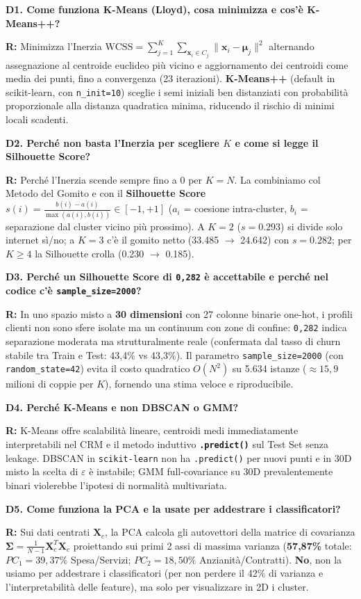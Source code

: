 \documentclass[10pt, a4paper]{article}
\newcommand{\qa}[2]{%
  \par\vspace{4pt}\noindent\textbf{\color{PrimaryNavy}#1}\par\vspace{1pt}%
  \noindent\textbf{\color{SecondaryBlue}R:} #2\par\vspace{2pt}%
}
\begin{document}
\qa{D1. Come funziona K-Means (Lloyd), cosa minimizza e cos'è K-Means++?}{
Minimizza l'Inerzia $\text{WCSS} = \sum_{j=1}^K \sum_{\mathbf{x}_i \in C_j} \|\mathbf{x}_i - \boldsymbol{\mu}_j\|^2$ alternando assegnazione al centroide euclideo più vicino e aggiornamento dei centroidi come media dei punti, fino a convergenza (23 iterazioni). \textbf{K-Means++} (default in scikit-learn, con \texttt{n\_init=10}) sceglie i semi iniziali ben distanziati con probabilità proporzionale alla distanza quadratica minima, riducendo il rischio di minimi locali scadenti.}

\qa{D2. Perché non basta l'Inerzia per scegliere $K$ e come si legge il Silhouette Score?}{
Perché l'Inerzia scende sempre fino a 0 per $K=N$. La combiniamo col Metodo del Gomito e con il \textbf{Silhouette Score} $s(i) = \frac{b(i)-a(i)}{\max(a(i), b(i))} \in [-1, +1]$ ($a_i$ = coesione intra-cluster, $b_i$ = separazione dal cluster vicino più prossimo). A $K=2$ ($s=0.293$) si divide solo internet sì/no; a $K=3$ c'è il gomito netto (33.485 $\rightarrow$ 24.642) con $s=0.282$; per $K \ge 4$ la Silhouette crolla (0.230 $\rightarrow$ 0.185).}

\qa{D3. Perché un Silhouette Score di \texttt{0,282} è accettabile e perché nel codice c'è \texttt{sample\_size=2000}?}{
In uno spazio misto a \textbf{30 dimensioni} con 27 colonne binarie one-hot, i profili clienti non sono sfere isolate ma un continuum con zone di confine: \texttt{0,282} indica separazione moderata ma strutturalmente reale (confermata dal tasso di churn stabile tra Train e Test: 43,4\% vs 43,3\%). Il parametro \texttt{sample\_size=2000} (con \texttt{random\_state=42}) evita il costo quadratico $O(N^2)$ su 5.634 istanze ($\approx 15{,}9$ milioni di coppie per $K$), fornendo una stima veloce e riproducibile.}

\qa{D4. Perché K-Means e non DBSCAN o GMM?}{
K-Means offre scalabilità lineare, centroidi medi immediatamente interpretabili nel CRM e il metodo induttivo \textbf{\texttt{.predict()}} sul Test Set senza leakage. DBSCAN in \texttt{scikit-learn} non ha \texttt{.predict()} per nuovi punti e in 30D misto la scelta di $\varepsilon$ è instabile; GMM full-covariance su 30D prevalentemente binari violerebbe l'ipotesi di normalità multivariata.}

\qa{D5. Come funziona la PCA e la usate per addestrare i classificatori?}{
Sui dati centrati $\mathbf{X}_c$, la PCA calcola gli autovettori della matrice di covarianza $\boldsymbol{\Sigma} = \frac{1}{N-1}\mathbf{X}_c^T\mathbf{X}_c$ proiettando sui primi 2 assi di massima varianza (\textbf{57,87\%} totale: $PC_1=39{,}37\%$ Spesa/Servizi; $PC_2=18{,}50\%$ Anzianità/Contratti). \textbf{No}, non la usiamo per addestrare i classificatori (per non perdere il 42\% di varianza e l'interpretabilità delle feature), ma solo per visualizzare in 2D i cluster.}
\end{document}
